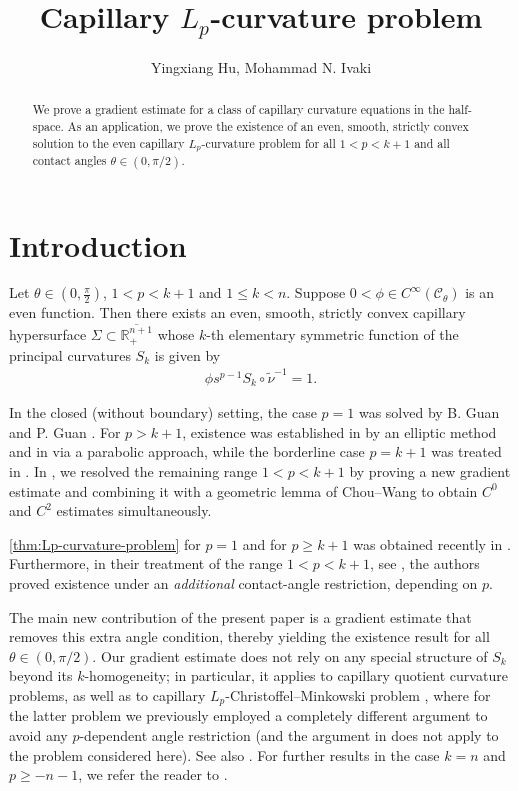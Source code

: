 \documentclass[12pt]{amsart}
\numberwithin{equation}{section}
\newcommand{\bbR}{\mathbb{R}}
\newcommand{\8}{\infty}
\newcommand{\cC}{\mathcal{C}}
\newcommand{\eq}[1]{\begin{equation}\begin{alignedat}{2}#1\end{alignedat}\end{equation}}
\begin{document}
\title{Capillary $L_p$-curvature problem}
\author[Y. Hu, M. N. Ivaki]{Yingxiang Hu,  Mohammad N. Ivaki}
\begin{abstract}
We prove a gradient estimate for a class of capillary curvature
equations in the half-space. As an application, we prove the existence of an even, smooth,
strictly convex solution to the even capillary $L_p$-curvature problem for all
$1<p<k+1$ and all contact angles $\theta\in(0,\pi/2)$.
\end{abstract}
\maketitle

\section{Introduction}
\begin{thm}\label{thm:Lp-curvature-problem}
Let $\theta \in (0,\frac{\pi}{2})$, $1 < p < k+1$ and $1 \leq k < n$. Suppose $0 < \phi \in C^{\infty}(\cC_\theta)$ is an even function. Then there exists an even, smooth, strictly convex capillary hypersurface $\Sigma \subset \overline{\bbR^{n+1}_{+}}$ whose $k$-th elementary symmetric function of the principal curvatures $S_k$ is given by
\eq{\label{capillary-CM-problem}
\phi  s^{p-1}S_k\circ\tilde{\nu}^{-1}= 1.
}
\end{thm}
In the closed (without boundary) setting, the case $p=1$ was solved by B. Guan and P. Guan \cite{GG02}. For $p> k+1$, existence was established in \cite{GRW15} by an elliptic method and in \cite{BIS21} via a parabolic approach, while the borderline case $p=k+1$ was treated in \cite{Lee23}. In \cite{HI24}, we resolved the remaining range $1<p<k+1$ by proving a new gradient estimate and combining it with a geometric lemma of Chou--Wang \cite{CW00} to obtain $C^0$ and $C^2$ estimates simultaneously.

\autoref{thm:Lp-curvature-problem} for $p=1$ and for $p\geq  k+1$ was obtained recently in \cite{MWW25c,MWW25d}. Furthermore, in their treatment of the range $1<p<k+1$, see \cite[Thm. 1.4]{MWW25d}, the authors proved existence under an \emph{additional} contact-angle restriction, depending on $p$.

The main new contribution of the present paper is a gradient estimate that removes this extra angle condition, thereby yielding the existence result for all $\theta\in(0,\pi/2)$. Our gradient estimate does not rely on any special structure of $S_k$ beyond its $k$-homogeneity; in particular, it applies to capillary quotient curvature problems, as well as to capillary $L_p$-Christoffel--Minkowski problem \cite{HI25b}, where for the latter problem we previously employed a completely different argument to avoid any $p$-dependent angle restriction (and the argument in \cite{HI25b} does not apply to the problem considered here). See also \cite{HIS25,MWW25dd}. For further results in the case $k=n$ and $p\geq -n-1$, we refer the reader to \cite{HI25,HHI25,MWW25a,MWW25b}.
\end{document}
